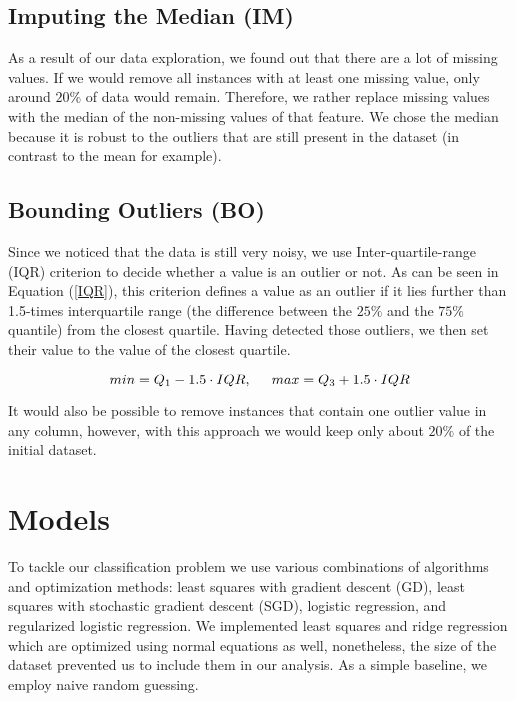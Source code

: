 \subsection{Imputing the Median (IM)}

As a result of our data exploration, we found out that there are a lot of missing values. If we would remove all instances with at least one missing value, only around $20\%$ of data would remain. Therefore, we rather replace missing values with the median of the non-missing values of that feature. We chose the median because it is robust to the outliers that are still present in the dataset (in contrast to the mean for example).



\subsection{Bounding Outliers (BO)}

Since we noticed that the data is still very noisy, we use Inter-quartile-range (IQR) criterion to decide whether a value is an outlier or not. As can be seen in Equation (\ref{IQR}), this criterion defines a value as an outlier if it lies further than 1.5-times interquartile range (the difference between the $25\%$ and the $75\%$ quantile) from the closest quartile. Having detected those outliers, we then set their value to the value of the closest quartile.

\begin{equation} \label{IQR}
   min = Q_1 - 1.5 \cdot IQR, \hspace{0.5cm} max = Q_3 + 1.5 \cdot IQR
\end{equation}

It would also be possible to remove instances that contain one outlier value in any column, however, with this approach we would keep only about $20\%$ of the initial dataset.








\section{Models}
\label{models}

To tackle our classification problem we use various combinations of algorithms and optimization methods: least squares with gradient descent (GD), least squares with stochastic gradient descent (SGD), logistic regression, and regularized logistic regression. We implemented least squares and ridge regression which are optimized using normal equations as well, nonetheless, the size of the dataset prevented us to include them in our analysis. As a simple baseline, we employ naive random guessing.

